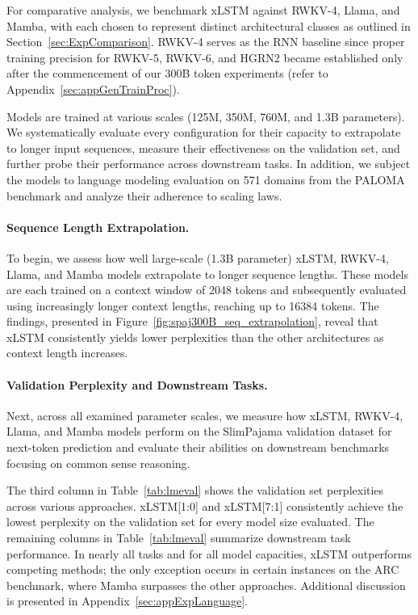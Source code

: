 For comparative analysis, we benchmark xLSTM against RWKV-4, Llama, and Mamba, with each chosen to represent distinct architectural classes as outlined in Section~\ref{sec:ExpComparison}. RWKV-4 serves as the RNN baseline since proper training precision for RWKV-5, RWKV-6, and HGRN2 became established only after the commencement of our 300B token experiments (refer to Appendix~\ref{sec:appGenTrainProc}).

Models are trained at various scales (125M, 350M, 760M, and 1.3B parameters). We systematically evaluate every configuration for their capacity to extrapolate to longer input sequences, measure their effectiveness on the validation set, and further probe their performance across downstream tasks. In addition, we subject the models to language modeling evaluation on 571 domains from the PALOMA benchmark and analyze their adherence to scaling laws.

\paragraph{Sequence Length Extrapolation.}
\label{sec:spaj300B_ctx_extrapolation}
To begin, we assess how well large-scale (1.3B parameter) xLSTM, RWKV-4, Llama, and Mamba models extrapolate to longer sequence lengths. These models are each trained on a context window of 2048 tokens and subsequently evaluated using increasingly longer context lengths, reaching up to 16384 tokens. The findings, presented in Figure~\ref{fig:spaj300B_seq_extrapolation}, reveal that xLSTM consistently yields lower perplexities than the other architectures as context length increases.

\paragraph{Validation Perplexity and Downstream Tasks.}
\label{sec:spaj_downstream_eval}
Next, across all examined parameter scales, we measure how xLSTM, RWKV-4, Llama, and Mamba models perform on the SlimPajama validation dataset for next-token prediction and evaluate their abilities on downstream benchmarks focusing on common sense reasoning.

The third column in Table~\ref{tab:lmeval} shows the validation set perplexities across various approaches. xLSTM[1:0] and xLSTM[7:1] consistently achieve the lowest perplexity on the validation set for every model size evaluated. The remaining columns in Table~\ref{tab:lmeval} summarize downstream task performance. In nearly all tasks and for all model capacities, xLSTM outperforms competing methods; the only exception occurs in certain instances on the ARC benchmark, where Mamba surpasses the other approaches. Additional discussion is presented in Appendix~\ref{sec:appExpLanguage}.

